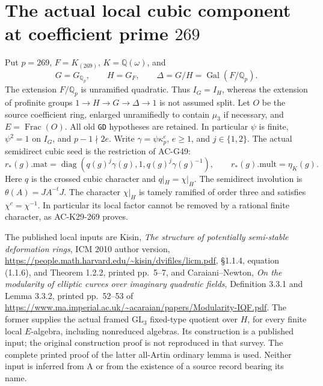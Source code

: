 \section{The actual local cubic component at coefficient prime \(269\)}
\label{sec:cubic-ramified-269-component}

Put \(p=269\), \(F=K_{(269)}\), \(K=\mathbb Q(\omega)\), and
\[
 G=G_{\mathbb Q_p},\qquad H=G_F,\qquad
 \Delta=G/H=\operatorname{Gal}(F/\mathbb Q_p).
 \tag{RC.1}
\]
The extension \(F/\mathbb Q_p\) is unramified quadratic.
Thus \(I_G=I_H\), whereas the extension of profinite groups
\(1\to H\to G\to\Delta\to1\) is not assumed split.
Let \(O\) be the source coefficient ring, enlarged unramifiedly
to contain \(\mu_3\) if necessary, and \(E=\operatorname{Frac}(O)\).
All old \texttt{GD} hypotheses are retained.  In particular
\(\psi\) is finite, \(\psi^2=1\) on \(I_G\), and
\(p-1\nmid2e\).  Write
\(\gamma=\psi\kappa_p^e\), \(e\geq1\), and \(j\in\{1,2\}\).
The actual semidirect cubic seed is the restriction of AC-G49:
\[
 r_*(g).\mathrm{mat}
   =\operatorname{diag}(q(g)^j\gamma(g),1,
                         q(g)^j\gamma(g)^{-1}),\qquad
 r_*(g).\mathrm{mult}=\eta_K(g).
 \tag{RC.2}
\]
Here \(q\) is the crossed cubic character and
\(q|_H=\chi|_H\).  The semidirect involution is
\(\theta(A)=JA^{-t}J\).  The character \(\chi|_H\) is tamely
ramified of order three and satisfies \(\chi^c=\chi^{-1}\).
In particular its local factor cannot be removed by a rational
finite character, as AC-K29-269 proves.

The published local inputs are Kisin,
\emph{The structure of potentially semi-stable deformation rings},
ICM 2010 author version,
\url{https://people.math.harvard.edu/~kisin/dvifiles/licm.pdf},
\S1.1.4, equation (1.1.6), and Theorem 1.2.2,
printed pp.~5--7, and Caraiani--Newton,
\emph{On the modularity of elliptic curves over imaginary quadratic
fields}, Definition 3.3.1 and Lemma 3.3.2,
printed pp.~52--53 of
\url{https://www.ma.imperial.ac.uk/~acaraian/papers/Modularity-IQF.pdf}.
The former supplies the actual framed \(\mathrm{GL}_3\) fixed-type
quotient over \(H\), for every finite local \(E\)-algebra, including
nonreduced algebras.  Its construction is a published input;
the original construction proof is not reproduced in that survey.
The complete printed proof of the latter all-Artin ordinary lemma
is used.  Neither input is inferred from A or from the existence
of a source record bearing its name.

